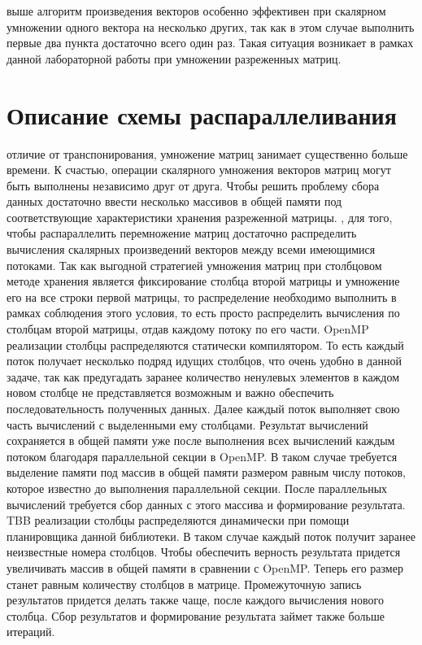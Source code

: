 \documentclass{report}
\begin{document}
 выше алгоритм произведения векторов особенно эффективен при скалярном умножении одного вектора на несколько других, так как в этом случае выполнить первые два пункта достаточно всего один раз. Такая ситуация возникает в рамках данной лабораторной работы при умножении разреженных матриц.

\newpage

\section*{Описание схемы распараллеливания}
 отличие от транспонирования, умножение матриц занимает существенно больше времени. К счастью, операции скалярного умножения векторов матриц могут быть выполнены независимо друг от друга. Чтобы решить проблему сбора данных достаточно ввести несколько массивов в общей памяти под соответствующие характеристики хранения разреженной матрицы.
, для того, чтобы распараллелить перемножение матриц достаточно распределить вычисления скалярных произведений векторов между всеми имеющимися потоками. Так как выгодной стратегией умножения матриц при столбцовом методе хранения является фиксирование столбца второй матрицы и умножение его на все строки первой матрицы, то распределение необходимо выполнить в рамках соблюдения этого условия, то есть просто распределить вычисления по столбцам второй матрицы, отдав каждому потоку по его части.
 OpenMP реализации столбцы распределяются статически компилятором. То есть каждый поток получает несколько подряд идущих столбцов, что очень удобно в данной задаче, так как предугадать заранее количество ненулевых элементов в каждом новом столбце не представляется возможным и важно обеспечить последовательность полученных данных. Далее каждый поток выполняет свою часть вычислений с выделенными ему столбцами. Результат вычислений сохраняется в общей памяти уже после выполнения всех вычислений каждым потоком благодаря параллельной секции в OpenMP. В таком случае требуется выделение памяти под массив в общей памяти размером равным числу потоков, которое известно до выполнения параллельной секции. После параллельных вычислений требуется сбор данных с этого массива и формирование результата.
 TBB реализации столбцы распределяются динамически при помощи планировщика данной библиотеки. В таком случае каждый поток получит заранее неизвестные номера столбцов. Чтобы обеспечить верность результата придется увеличивать массив в общей памяти в сравнении с OpenMP. Теперь его размер станет равным количеству столбцов в матрице. Промежуточную запись результатов придется делать также чаще, после каждого вычисления нового столбца. Сбор результатов и формирование результата займет также больше итераций.
\end{document}
